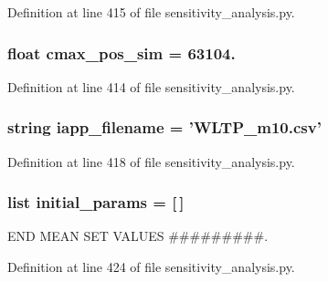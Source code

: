 Definition at line 415 of file sensitivity\-\_\-analysis.\-py.

\hypertarget{namespacesensitivity__analysis_aa5b015cc7d0bda453c6163023448db72}{
\subsubsection[{cmax\-\_\-pos\-\_\-sim}]{\setlength{\rightskip}{0pt plus 5cm}float cmax\-\_\-pos\-\_\-sim = 63104.}}\label{namespacesensitivity__analysis_aa5b015cc7d0bda453c6163023448db72}


Definition at line 414 of file sensitivity\-\_\-analysis.\-py.

\hypertarget{namespacesensitivity__analysis_af0a721bf4042ba266855bd73da684844}{
\subsubsection[{iapp\-\_\-filename}]{\setlength{\rightskip}{0pt plus 5cm}string iapp\-\_\-filename = 'W\-L\-T\-P\-\_\-m10.\-csv'}}\label{namespacesensitivity__analysis_af0a721bf4042ba266855bd73da684844}


Definition at line 418 of file sensitivity\-\_\-analysis.\-py.

\hypertarget{namespacesensitivity__analysis_af973d7a362a975c2c180328006f497d3}{
\subsubsection[{initial\-\_\-params}]{\setlength{\rightskip}{0pt plus 5cm}list initial\-\_\-params = \mbox{[}$\,$\mbox{]}}}\label{namespacesensitivity__analysis_af973d7a362a975c2c180328006f497d3}


E\-N\-D M\-E\-A\-N S\-E\-T V\-A\-L\-U\-E\-S \#\#\#\#\#\#\#\#\#. 



Definition at line 424 of file sensitivity\-\_\-analysis.\-py.

